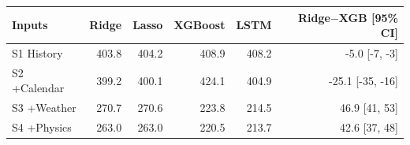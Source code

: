 \begin{tabular}{lrrrrr}
\toprule
Inputs & Ridge & Lasso & XGBoost & LSTM & Ridge$-$XGB [95\% CI] \\
\midrule
S1 History & 403.8 & 404.2 & 408.9 & 408.2 & -5.0 [-7, -3] \\
S2 +Calendar & 399.2 & 400.1 & 424.1 & 404.9 & -25.1 [-35, -16] \\
S3 +Weather & 270.7 & 270.6 & 223.8 & 214.5 & 46.9 [41, 53] \\
S4 +Physics & 263.0 & 263.0 & 220.5 & 213.7 & 42.6 [37, 48] \\
\bottomrule
\end{tabular}